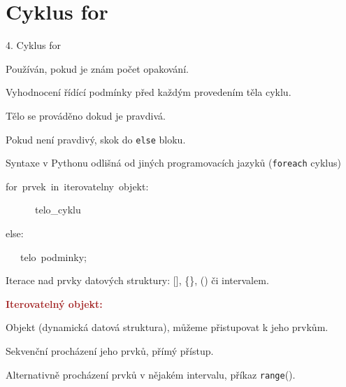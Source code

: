 \documentclass[czech]{beamer}
\newenvironment{lyxcode}
  {\par\begin{list}{}{
    \setlength{\rightmargin}{\leftmargin}
    \setlength{\listparindent}{0pt}%
    \raggedright
    \setlength{\itemsep}{0pt}
    \setlength{\parsep}{0pt}
    \normalfont\ttfamily}%
   \def\{{\char`\{}
   \def\}{\char`\}}
   \def\textasciitilde{\char`\~}
   \item[]}
  {\end{list}}
\begin{document}
\section{Cyklus for}
\begin{frame}[plain]{4. Cyklus for}

{\scriptsize Používán, pokud je znám počet opakování.}{\scriptsize\par}

{\scriptsize\bigskip{}
Vyhodnocení řídící podmínky před každým provedením těla cyklu.}{\scriptsize\par}

{\scriptsize Tělo se prováděno dokud je pravdivá.}{\scriptsize\par}

{\scriptsize Pokud není pravdivý, skok do }{\scriptsize\texttt{else}}{\scriptsize{}
bloku.\bigskip{}
}{\scriptsize\par}

{\scriptsize Syntaxe v Pythonu odlišná od jiných programovacích jazyků
(}{\scriptsize\texttt{foreach}}{\scriptsize{} cyklus)}{\scriptsize\par}
\begin{lyxcode}
{\scriptsize for~prvek~in~iterovatelny~objekt:~~}{\scriptsize\par}

{\scriptsize ~~~~~~telo\_cyklu}{\scriptsize\par}

{\scriptsize else:}{\scriptsize\par}

{\scriptsize ~~~telo~podminky;}{\scriptsize\par}
\end{lyxcode}
{\scriptsize Iterace nad prvky datových struktury: {[}{]}, \{\}, ()
či intervalem.}{\scriptsize\par}

{\scriptsize\medskip{}
}{\scriptsize\par}

{\scriptsize\textbf{\textcolor{brown}{Iterovatelný objekt:}}}{\scriptsize\par}

{\scriptsize Objekt (dynamická datová struktura), můžeme přistupovat
k jeho prvkům.}{\scriptsize\par}

{\scriptsize Sekvenční procházení jeho prvků, přímý přístup.\bigskip{}
}{\scriptsize\par}

{\scriptsize Alternativně procházení prvků v nějakém intervalu, příkaz
}{\scriptsize\texttt{range}}{\scriptsize ().\bigskip{}
}{\scriptsize\par}


\end{frame}
\end{document}
